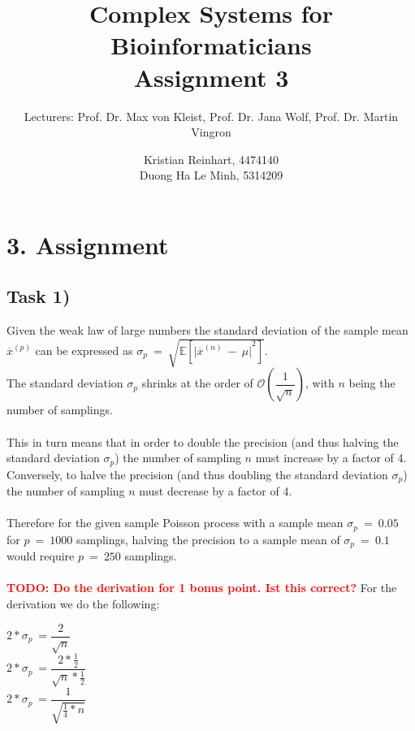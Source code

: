 \documentclass[]{scrartcl}
\title{Complex Systems for Bioinformaticians \\ \vspace{2mm} Assignment 3 \\ \vspace{2mm}}
\subtitle{Lecturers: Prof. Dr. Max von Kleist, Prof. Dr. Jana Wolf, Prof. Dr. Martin Vingron}
\author{Kristian Reinhart, 4474140 \\ Duong Ha Le Minh, 5314209}
\begin{document}
\maketitle




\section*{3. Assignment}


\subsection*{Task 1)}

Given the weak law of large numbers the standard deviation of the sample mean $\overline{x}^{(p)}$ can be expressed as
$\sigma_{p} ~ = ~ \sqrt{\mathbb{E} \left[ { \vert \overline{x}^{(n)} ~ - ~ \mu \vert }^{2} \right] }$.
\\
The standard deviation $\sigma_{p}$ shrinks at the order of $\mathcal{O} \left( \dfrac{1}{\sqrt{n}} \right)$, with $n$ being the number of samplings.
\\
\\
This in turn means that in order to double the precision (and thus halving the standard deviation $\sigma_{p}$) the number of sampling $n$ must increase by a factor of 4.
Conversely, to halve the precision (and thus doubling the standard deviation $\sigma_{p}$) the number of sampling $n$ must decrease by a factor of 4.
\\
\\
Therefore for the given sample Poisson process with a sample mean  $\sigma_{p}~=~0.05$ for $p~=~1000$ samplings, halving the precision to a sample mean of  $\sigma_{p}~=~0.1$ would require $p~=~250$ samplings. 
\\
\\
\textbf{\textcolor{red}{TODO: Do the derivation for 1 bonus point. Ist this correct?}}
For the derivation we do the following:
\\
\begin{center}
$2* \sigma_{p} ~ = \dfrac{2}{\sqrt{n}}~$
\\
$2* \sigma_{p} ~ = \dfrac{2 * \frac{1}{2}}{\sqrt{n} * \frac{1}{2}}~$
\\
$2* \sigma_{p} ~ = \dfrac{1}{\sqrt{\frac{1}{4} * n}}~$
\end{center}
\end{document}
